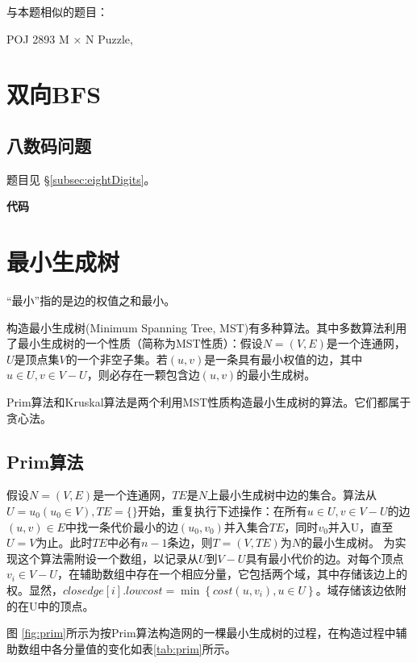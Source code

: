 与本题相似的题目：
\begindot
\item  POJ 2893 M × N Puzzle, 
\myenddot

\section{双向BFS} %
\label{sec:biBFS}
\subsection{八数码问题}
题目见 \S \ref{subsec:eightDigits}。

\textbf{代码}

\begin{Codex}[label=eight_digits_bibfs.c]
\end{Codex}

\section{最小生成树} %
“最小”指的是边的权值之和最小。

构造最小生成树(Minimum Spanning Tree, MST)有多种算法。其中多数算法利用了最小生成树的一个性质（简称为MST性质）：假设$N=(V, E)$是一个连通网，$U$是顶点集$V$的一个非空子集。若$(u, v)$是一条具有最小权值的边，其中$u \in U, v \in V-U$，则必存在一颗包含边$(u, v)$的最小生成树。

Prim算法和Kruskal算法是两个利用MST性质构造最小生成树的算法。它们都属于贪心法。

\subsection{Prim算法}
假设$N=(V, E)$是一个连通网，$TE$是$N$上最小生成树中边的集合。算法从$U={u_0}(u_0 \in V), TE=\{\}$开始，重复执行下述操作：在所有$u \in U, v \in V-U$的边$(u, v) \in E$中找一条代价最小的边$(u_0, v_0)$并入集合$TE$，同时$v_0$并入U，直至$U=V$为止。此时$TE$中必有$n-1$条边，则$T=(V, TE)$为$N$的最小生成树。
为实现这个算法需附设一个数组，以记录从$U$到$V-U$具有最小代价的边。对每个顶点$v_i \in V-U$，在辅助数组中存在一个相应分量，它包括两个域，其中存储该边上的权。显然，$closedge[i].lowcost=\min\left\{cost(u, v_i), u \in U\right\}$。域存储该边依附的在U中的顶点。

图 \ref{fig:prim}所示为按Prim算法构造网的一棵最小生成树的过程，在构造过程中辅助数组中各分量值的变化如表\ref{tab:prim}所示。

